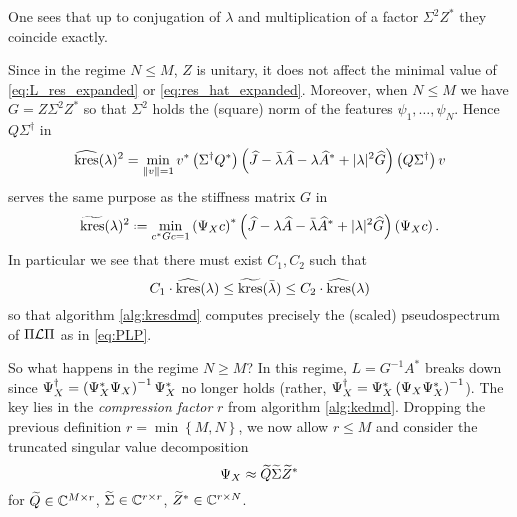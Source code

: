 One sees that up to conjugation of 
$\lambda$ and multiplication of a factor $\Sigma^2 Z^*$ they coincide exactly. 

Since in the regime $N \leq M$, $Z$ is unitary, it does not affect the minimal value 
of \ref{eq:L_res_expanded} or \ref{eq:res_hat_expanded}. Moreover, when $N \leq M$ we 
have $G = Z \Sigma^2 Z^*$ so that $\Sigma^2$ holds the (square) norm of the features 
$\psi_1, \ldots, \psi_N$. Hence $Q \Sigma^\dagger$ in 
\begin{equation}
    \widehat{ \text{kres} } (\lambda)^2 = 
    \min_{\| v \| = 1}
    v^* \left( \Sigma^\dagger Q^* \right) 
    \left( 
        \widehat{ J }
        - \bar{\lambda} \widehat{ A } 
        - \lambda \widehat{ A }^* 
        + | \lambda |^2 \widehat{ G }
    \right)
    \left( Q \Sigma^\dagger \right) v
\end{equation}
serves the same purpose as the stiffness matrix $G$ in 
\begin{equation}
    \label{eq:kres_tilde}
    \widetilde{ \kres } (\lambda)^2 \defeq 
    \min_{c^* G c = 1}
    \left( \YX c \right)^*
    \left( 
        \widehat{ J }
        - \lambda \widehat{ A } 
        - \bar{\lambda} \widehat{ A }^* 
        + | \lambda |^2 \widehat{ G }
    \right)
    \left( \YX c \right) . 
\end{equation}
In particular we see that there must exist $C_1, C_2$ such that 
\begin{equation}
    C_1 \cdot \widehat{ \text{kres} } (\lambda) \leq 
    \widetilde{ \text{kres} } (\bar{\lambda}) \leq
    C_2 \cdot \widehat{ \text{kres} } (\lambda)
\end{equation}
so that algorithm \ref{alg:kresdmd} computes precisely the (scaled) pseudospectrum of 
$\Pi \mathcal{L} \Pi$ as in \ref{eq:PLP}. 

So what happens in the regime $N \geq M$? In this regime, $L = G^{-1} A^*$ 
breaks down since $\Psi_X^\dagger = \left( \Psi_X^* \Psi_X \right)^{-1} \Psi_X^*$ no longer holds 
(rather, $\Psi_X^\dagger = \Psi_X^* \left( \Psi_X \Psi_X^* \right)^{-1}$). The key lies in the 
\emph{compression factor} $r$ from algorithm \ref{alg:kedmd}. Dropping the previous 
definition $r = \min\left\{ M, N \right\}$, we now allow $r \leq M$ and consider the 
truncated singular value decomposition 
\begin{equation}
    \Psi_X \approx \widetilde{ Q } \widetilde{ \Sigma } \widetilde{ Z }^*
\end{equation}
for $\widetilde{ Q } \in \mathbb{C}^{M \times r}$, $\widetilde{ \Sigma } \in \mathbb{C}^{r \times r}$, 
$\widetilde{ Z }^* \in \mathbb{C}^{r \times N}$. 

